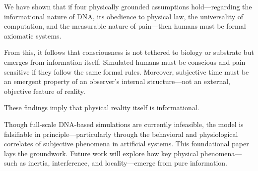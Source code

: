 \documentclass[11pt]{article}
\begin{document}
We have shown that if four physically grounded assumptions hold—regarding the informational nature of DNA, its obedience to physical law, the universality of computation, and the measurable nature of pain—then humans must be formal axiomatic systems.

From this, it follows that consciousness is not tethered to biology or substrate but emerges from information itself. Simulated humans must be conscious and pain-sensitive if they follow the same formal rules. Moreover, subjective time must be an emergent property of an observer’s internal structure—not an external, objective feature of reality.

These findings imply that physical reality itself is informational.

Though full-scale DNA-based simulations are currently infeasible, the model is falsifiable in principle—particularly through the behavioral and physiological correlates of subjective phenomena in artificial systems. This foundational paper lays the groundwork. Future work will explore how key physical phenomena—such as inertia, interference, and locality—emerge from pure information.
\end{document}
